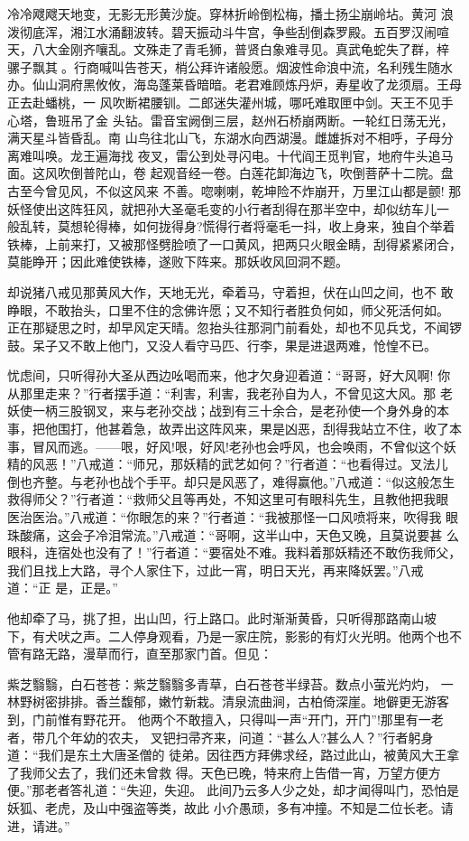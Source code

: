 冷冷飕飕天地变，无影无形黄沙旋。穿林折岭倒松梅，播土扬尘崩岭坫。黄河
浪泼彻底浑，湘江水涌翻波转。碧天振动斗牛宫，争些刮倒森罗殿。五百罗汉闹喧
天，八大金刚齐嚷乱。文殊走了青毛狮，普贤白象难寻见。真武龟蛇失了群，梓
骡子飘其。行商喊叫告苍天，梢公拜许诸般愿。烟波性命浪中流，名利残生随水
办。仙山洞府黑攸攸，海岛蓬莱昏暗暗。老君难顾炼丹炉，寿星收了龙须扇。王母
正去赴蟠桃，一
风吹断裙腰钏。二郎迷失灌州城，哪吒难取匣中剑。天王不见手心塔，鲁班吊了金
头钻。雷音宝阙倒三层，赵州石桥崩两断。一轮红日荡无光，满天星斗皆昏乱。南
山鸟往北山飞，东湖水向西湖漫。雌雄拆对不相呼，子母分离难叫唤。龙王遍海找
夜叉，雷公到处寻闪电。十代阎王觅判官，地府牛头追马面。这风吹倒普陀山，卷
起观音经一卷。白莲花卸海边飞，吹倒菩萨十二院。盘古至今曾见风，不似这风来
不善。唿喇喇，乾坤险不炸崩开，万里江山都是颤!
那妖怪使出这阵狂风，就把孙大圣毫毛变的小行者刮得在那半空中，却似纺车儿一
般乱转，莫想轮得棒，如何拢得身?慌得行者将毫毛一抖，收上身来，独自个举着
铁棒，上前来打，又被那怪劈脸喷了一口黄风，把两只火眼金睛，刮得紧紧闭合，
莫能睁开；因此难使铁棒，遂败下阵来。那妖收风回洞不题。

却说猪八戒见那黄风大作，天地无光，牵着马，守着担，伏在山凹之间，也不
敢睁眼，不敢抬头，口里不住的念佛许愿；又不知行者胜负何如，师父死活何如。
正在那疑思之时，却早风定天晴。忽抬头往那洞门前看处，却也不见兵戈，不闻锣
鼓。呆子又不敢上他门，又没人看守马匹、行李，果是进退两难，怆惶不已。

忧虑间，只听得孙大圣从西边吆喝而来，他才欠身迎着道：“哥哥，好大风啊!
你从那里走来？”行者摆手道：“利害，利害，我老孙自为人，不曾见这大风。那
老妖使一柄三股钢叉，来与老孙交战；战到有三十余合，是老孙使一个身外身的本
事，把他围打，他甚着急，故弄出这阵风来，果是凶恶，刮得我站立不住，收了本
事，冒风而逃。——哏，好风!哏，好风!老孙也会呼风，也会唤雨，不曾似这个妖
精的风恶！”八戒道：“师兄，那妖精的武艺如何？”行者道：“也看得过。叉法儿
倒也齐整。与老孙也战个手平。却只是风恶了，难得赢他。”八戒道：“似这般怎生
救得师父？”行者道：“救师父且等再处，不知这里可有眼科先生，且教他把我眼
医治医治。”八戒道：“你眼怎的来？”行者道：“我被那怪一口风喷将来，吹得我
眼珠酸痛，这会子冷泪常流。”八戒道：“哥啊，这半山中，天色又晚，且莫说要甚
么眼科，连宿处也没有了！”行者道：“要宿处不难。我料着那妖精还不敢伤我师父，
我们且找上大路，寻个人家住下，过此一宵，明日天光，再来降妖罢。”八戒道：“正
是，正是。”

他却牵了马，挑了担，出山凹，行上路口。此时渐渐黄昏，只听得那路南山坡
下，有犬吠之声。二人停身观看，乃是一家庄院，影影的有灯火光明。他两个也不
管有路无路，漫草而行，直至那家门首。但见：

紫芝翳翳，白石苍苍：紫芝翳翳多青草，白石苍苍半绿苔。数点小萤光灼灼，
一林野树密排排。香兰馥郁，嫩竹新栽。清泉流曲涧，古柏倚深崖。地僻更无游客
到，门前惟有野花开。
他两个不敢擅入，只得叫一声“开门，开门”!那里有一老者，带几个年幼的农夫，
叉钯扫帚齐来，问道：“甚么人?甚么人？”行者躬身道：“我们是东土大唐圣僧的
徒弟。因往西方拜佛求经，路过此山，被黄风大王拿了我师父去了，我们还未曾救
得。天色已晚，特来府上告借一宵，万望方便方便。”那老者答礼道：“失迎，失迎。
此间乃云多人少之处，却才闻得叫门，恐怕是妖狐、老虎，及山中强盗等类，故此
小介愚顽，多有冲撞。不知是二位长老。请进，请进。”

